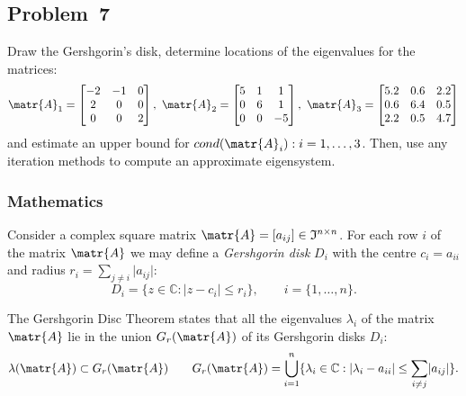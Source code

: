 \subsection{Problem~7}%
\label{problem:7}

Draw the Gershgorin's disk, determine locations of the eigenvalues for the matrices:
\begin{equation*}
  \matr{A}_1 = 
  \begin{bmatrix}
    -2 & -1 & 0\\
     2 &  0 & 0\\
     0 &  0 & 2
  \end{bmatrix},\ 
  \matr{A}_2 = 
  \begin{bmatrix}
    5 & 1 &  1\\
    0 & 6 &  1\\
    0 & 0 & -5
  \end{bmatrix},\ 
  \matr{A}_3 = 
  \begin{bmatrix}
    5.2 & 0.6 & 2.2\\
    0.6 & 6.4 & 0.5\\
    2.2 & 0.5 & 4.7
  \end{bmatrix}
\end{equation*}
and estimate an upper bound for $cond(\matr{A}_i) : i = 1, \ldots, 3$.
Then, use any iteration methods to compute an approximate eigensystem.

\subsubsection*{Mathematics}
\nocite{Zdunek,Gerschgorin}

Consider a complex square matrix $\matr{A}=\left[a_{ij}\right]\in\mathfrak{I}^{n\times{}n}$.
For each row $i$ of the matrix $\matr{A}$ we may define a \textit{Gershgorin disk} $D_i$ with the centre $c_i=a_{ii}$ and radius $r_i = \sum_{j \neq i} \lvert a_{ij}\rvert$:
\begin{equation*}
  D_i=\{z\in\mathbb{C}:\lvert z - c_i\rvert\le r_i\},\qquad i = \{1,\ldots,n\}.
\end{equation*}

The Gershgorin Disc Theorem states that all the eigenvalues $\lambda_i$  of the matrix $\matr{A}$ lie in the union $ G_r(\matr{A})$ of its Gershgorin disks $D_i$:
\begin{equation*}
  \lambda(\matr{A})\subset G_r(\matr{A})\qquad
  G_r(\matr{A})=\bigcup_{i=1}^n\{\lambda_i\in\mathbb{C}:\lvert \lambda_i - a_{ii}\rvert\le \sum_{i \neq j} \lvert a_{ij}\rvert\}.
\end{equation*}

